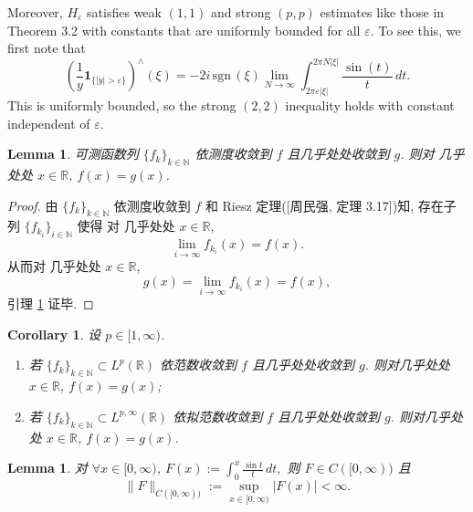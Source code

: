 \documentclass[a4paper,11pt]{article}
\newtheorem{lemma}[theorem]{Lemma}
\newtheorem{corollary}[theorem]{Corollary}
\theoremstyle{definition}
\def \sgn{\mathrm{\,sgn\,}}
\begin{document}
\begin{CJK*}{UTF8}{gbsn}
\begin{framed}
    Moreover, $ H_\varepsilon $ satisfies weak $ (1, 1) $ and
    strong $ (p, p) $ estimates like those in Theorem 3.2 with constants that are
    uniformly bounded for all $ \varepsilon $.
    To see this, we first note that 
    $$ 
        \left( \frac{1}{y} \mathbf{1}_{\{|y| > \varepsilon\}} \right)^\wedge (\xi)
            = - 2 i \sgn (\xi) \lim_{N \to \infty} 
                \int_{2 \pi \varepsilon |\xi|}^{2 \pi N |\xi|} \frac{\sin (t)}{t} \, dt.
    $$ 
    This is uniformly bounded,
    so the strong $ (2,2) $ inequality holds with constant independent of $ \varepsilon $.
\end{framed}

\begin{lemma} \label{lem4}
    可测函数列 $ \{f_k\}_{k \in \mathbb{N}} $ 依测度收敛到 $ f $
    且几乎处处收敛到 $ g $. 则对 几乎处处 $ x \in \mathbb{R} $, $ f(x) = g(x) $.
\end{lemma}

\begin{proof}
    由 $ \{f_k\}_{k \in \mathbb{N}} $ 依测度收敛到 $ f $ 和 Riesz 定理([周民强, 定理 3.17])知, 
    存在子列 $ \{f_{k_i}\}_{i \in \mathbb{N}} $ 使得
    对 几乎处处 $ x \in \mathbb{R} $, 
    $$
        \lim_{i \to \infty} f_{k_i} (x) = f(x).
    $$
    从而对 几乎处处 $ x \in \mathbb{R} $, 
    $$
        g(x) = \lim_{i \to \infty} f_{k_i} (x) = f(x),
    $$
    引理 \ref{lem4} 证毕.
\end{proof}

\begin{corollary} \label{corollary}
    设 $ p \in [1, \infty) $. 
    \begin{enumerate}[{\rm(i)}]
        \item 若 $ \{f_k\}_{k \in \mathbb{N}} \subset L^p(\mathbb{R}) $ 依范数收敛到 $ f $ 
        且几乎处处收敛到 $ g $. 则对几乎处处 $ x \in \mathbb{R} $, $ f(x) = g(x) $;
        \item 若 $ \{f_k\}_{k \in \mathbb{N}} \subset L^{p, \infty}(\mathbb{R}) $ 依拟范数收敛到 $ f $ 
        且几乎处处收敛到 $ g $. 则对几乎处处 $ x \in \mathbb{R} $, $ f(x) = g(x) $.
    \end{enumerate}
\end{corollary}

\begin{lemma} \label{lem1}
    对 $ \forall x \in [0, \infty) $, 
    $  F(x) := \int_0^x \frac{\sin t}{t} \, dt, $
    则 $ F \in C([0, \infty)) $ 且 
    $$ 
        \| F \|_{C([0, \infty))} := \sup_{x \in [0, \infty)} |F(x)| < \infty.
    $$
\end{lemma}


\end{CJK*}
\end{document}
